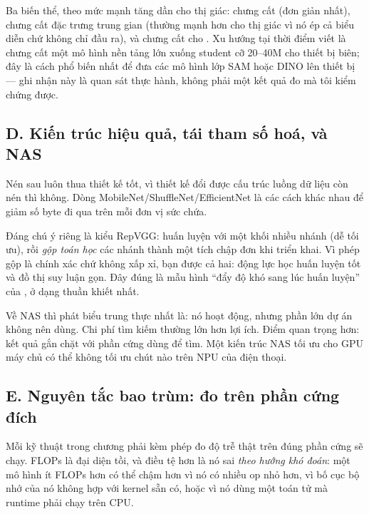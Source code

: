 \documentclass[../../deep_learning.tex]{subfiles}
\begin{document}

Ba biến thể, theo mức mạnh tăng dần cho thị giác: chưng cất  (đơn giản nhất), chưng cất đặc trưng trung gian (thường mạnh hơn cho thị giác vì nó ép cả biểu diễn chứ không chỉ đầu ra), và chưng cất  cho  \cite{touvron2021deit}. Xu hướng tại thời điểm viết là chưng cất một mô hình nền tảng lớn xuống student cỡ 20--40M cho thiết bị biên; đây là cách phổ biến nhất để đưa các mô hình lớp SAM hoặc DINO lên thiết bị --- ghi nhận này là quan sát thực hành, không phải một kết quả đo mà tôi kiểm chứng được.

\subsection{D. Kiến trúc hiệu quả, tái tham số hoá, và NAS}
Nén sau luôn thua thiết kế tốt, vì thiết kế đổi được cấu trúc luồng dữ liệu còn nén thì không. Dòng MobileNet/ShuffleNet/EfficientNet \cite{howard2017mobilenets,tan2019efficientnet} là các cách khác nhau để giảm số byte đi qua trên mỗi đơn vị sức chứa.

Đáng chú ý riêng là  kiểu RepVGG: huấn luyện với một khối nhiều nhánh (dễ tối ưu), rồi \emph{gộp toán học} các nhánh thành một tích chập đơn khi triển khai. Vì phép gộp là chính xác chứ không xấp xỉ, bạn được cả hai: động lực học huấn luyện tốt và đồ thị suy luận gọn. Đây đúng là mẫu hình ``đẩy độ khó sang lúc huấn luyện'' của , ở dạng thuần khiết nhất.


Về NAS thì phát biểu trung thực nhất là: nó hoạt động, nhưng phần lớn dự án không nên dùng. Chi phí tìm kiếm thường lớn hơn lợi ích. Điểm quan trọng hơn: kết quả gắn chặt với phần cứng dùng để tìm. Một kiến trúc NAS tối ưu cho GPU máy chủ có thể không tối ưu chút nào trên NPU của điện thoại.

\subsection{E. Nguyên tắc bao trùm: đo trên phần cứng đích}
Mỗi kỹ thuật trong chương phải kèm phép đo độ trễ thật trên đúng phần cứng sẽ chạy. FLOPs là đại diện tồi, và điều tệ hơn là nó sai \emph{theo hướng khó đoán}: một mô hình ít FLOPs hơn có thể chậm hơn vì nó có nhiều op nhỏ hơn, vì bố cục bộ nhớ của nó không hợp với kernel sẵn có, hoặc vì nó dùng một toán tử mà runtime phải chạy trên CPU.
\end{document}
